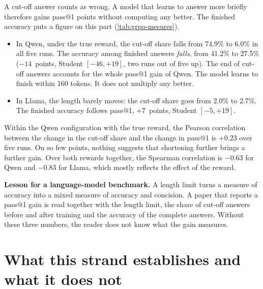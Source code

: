 A cut-off answer counts as wrong. A model that learns to answer more briefly therefore gains pass@1
points without computing any better. The finished accuracy puts a figure on this part
(\cref{tab:grpo-mesures}).
\begin{itemize}
  \item In Qwen, under the true reward, the cut-off share falls from 74.9\% to 6.0\% in all five runs. The
    accuracy among finished answers \emph{falls}, from 41.2\% to 27.5\% ($-14$~points, Student
    $[-46, +19]$, two runs out of five up). The end of cut-off answers accounts for the whole pass@1 gain
    of Qwen. The model learns to finish within 160 tokens. It does not multiply any better.
  \item In Llama, the length barely moves: the cut-off share goes from 2.0\% to 2.7\%. The finished
    accuracy follows pass@1, $+7$~points, Student $[-5, +19]$.
\end{itemize}
Within the Qwen configuration with the true reward, the Pearson correlation between the change in the
cut-off share and the change in pass@1 is $+0.23$ over five runs. On so few points, nothing suggests that
shortening further brings a further gain.
Over both rewards together, the Spearman correlation is $-0.63$ for Qwen and $-0.83$ for Llama, which
mostly reflects the effect of the reward.

\begin{keybox}
\textbf{Lesson for a language-model benchmark.} A length limit turns a measure of accuracy into a
mixed measure of accuracy and concision. A paper that reports a pass@1 gain is read together with the
length limit, the share of cut-off answers before and after training and the accuracy of
the complete answers. Without these three numbers, the reader does not know what the gain measures.
\end{keybox}

\section{What this strand establishes and what it does not}
\label{sec:llm-portee}

